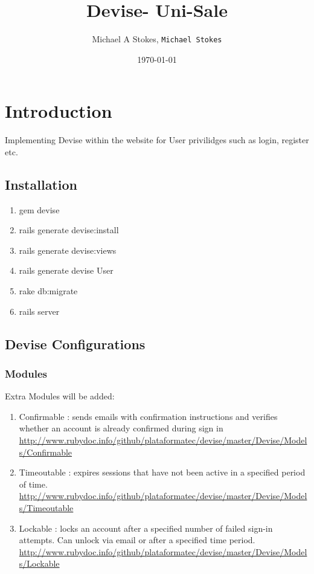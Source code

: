 \documentclass[11pt]{article}
\title{Devise- Uni-Sale}
\author{Michael A Stokes, \texttt{Michael Stokes}}
\date{\today}
\begin{document}
\maketitle

\section{Introduction}
Implementing Devise within the website for User
privilidges such as login, register etc.

\subsection{Installation}

\begin{enumerate}
\item gem devise
\item rails generate devise:install
\item rails generate devise:views
\item rails generate devise User
\item rake db:migrate
\item rails server
\end{enumerate}

\subsection{Devise Configurations}

\subsubsection{Modules}
Extra Modules will be added:

\begin{enumerate}
\item Confirmable : sends emails with confirmation instructions and verifies whether an account is already confirmed during sign in
{\url{http://www.rubydoc.info/github/plataformatec/devise/master/Devise/Models/Confirmable}}
\item Timeoutable : expires sessions that have not been active in a specified period of time.
{\url{http://www.rubydoc.info/github/plataformatec/devise/master/Devise/Models/Timeoutable}}
\item Lockable : locks an account after a specified number of failed sign-in attempts. Can unlock via email or after a specified time period.
{\url{http://www.rubydoc.info/github/plataformatec/devise/master/Devise/Models/Lockable}}
\end{enumerate}
\end{document}
